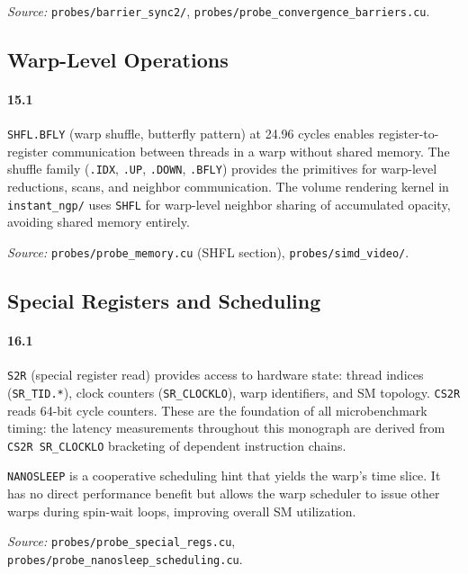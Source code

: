 \textit{Source:} \texttt{probes/barrier\_sync2/},
\texttt{probes/probe\_convergence\_barriers.cu}.

\subsection{Warp-Level Operations}
\label{par:warp}

\paragraph{15.1}
\texttt{SHFL.BFLY} (warp shuffle, butterfly pattern) at 24.96 cycles
enables register-to-register communication between threads in a warp
without shared memory.  The shuffle family (\texttt{.IDX}, \texttt{.UP},
\texttt{.DOWN}, \texttt{.BFLY}) provides the primitives for warp-level
reductions, scans, and neighbor communication.  The volume rendering
kernel in \texttt{instant\_ngp/} uses \texttt{SHFL} for warp-level
neighbor sharing of accumulated opacity, avoiding shared memory entirely.

\textit{Source:} \texttt{probes/probe\_memory.cu} (SHFL section),
\texttt{probes/simd\_video/}.

\subsection{Special Registers and Scheduling}
\label{par:special}

\paragraph{16.1}
\texttt{S2R} (special register read) provides access to hardware state:
thread indices (\texttt{SR\_TID.*}), clock counters (\texttt{SR\_CLOCKLO}),
warp identifiers, and SM topology.  \texttt{CS2R} reads 64-bit cycle
counters.  These are the foundation of all microbenchmark timing:
the latency measurements throughout this monograph are derived from
\texttt{CS2R SR\_CLOCKLO} bracketing of dependent instruction chains.

\texttt{NANOSLEEP} is a cooperative scheduling hint that yields the warp's
time slice.  It has no direct performance benefit but allows the warp
scheduler to issue other warps during spin-wait loops, improving overall
SM utilization.

\textit{Source:} \texttt{probes/probe\_special\_regs.cu},
\texttt{probes/probe\_nanosleep\_scheduling.cu}.

